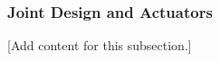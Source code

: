 
\subsubsection{Joint Design and Actuators}
\label{subsubsec:design_2_1_5_joint_design_actuators}

[Add content for this subsection.]

